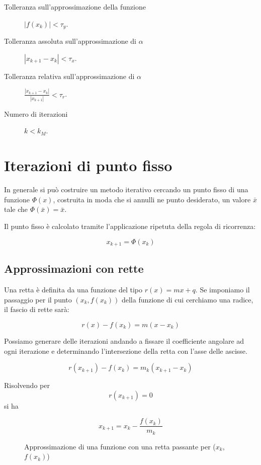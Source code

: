 \documentclass[12pt]{article}
\theoremstyle{plain}%
\theoremstyle{definition}
\theoremstyle{remark}
\begin{document}
\begin{description}
\item[Tolleranza sull'approssimazione della funzione]$|f(x_k)| < \tau_y$.
\item[Tolleranza assoluta sull'approssimazione di $\alpha$] $|x_{k + 1} - x_{k}| < \tau_x$.
\item[Tolleranza relativa sull'approssimazione di $\alpha$] $\frac{|x_{k + 1} - x_{k}|}{|x_{k+1}|} < \tau_r$.
\item[Numero di iterazioni] $k < k_M$. 
\end{description}




\section{Iterazioni di punto fisso}

In generale si può costruire un metodo iterativo cercando un punto fisso di una funzione $\Phi(x)$,
costruita in moda che si annulli ne punto desiderato, un valore $\bar{x}$ tale che $\Phi(\bar{x}) = \bar{x}$.

Il punto fisso è calcolato tramite l'applicazione ripetuta della regola di ricorrenza:

$$x_{k+1} = \Phi(x_k)$$

\subsection{Approssimazioni con rette}

Una retta è definita da una funzione del tipo $r(x) = m x + q$.
Se imponiamo il passaggio per il punto $(x_k, f(x_k))$ della funzione di cui cerchiamo una radice, il fascio di rette sarà:

$$r(x) - f(x_k) = m (x - x_k)$$

Possiamo generare delle iterazioni andando a fissare il coefficiente angolare ad ogni iterazione e determinando l'intersezione della retta con l'asse delle ascisse.

$$r(x_{k+1}) - f(x_k) = m_k (x_{k+1} - x_k)$$

Risolvendo per $$r(x_{k+1}) = 0$$ si ha

\begin{equation}
    x_{k+1} = x_k - \frac{f(x_k)}{m_k}
\end{equation}

\begin{figure}[!htbp]
    \begin{center}
        
        \caption{Approssimazione di una funzione con una retta passante per ($x_k$, $f(x_k)$)}
        \label{fig:retta_approx}
    \end{center}
\end{figure}

% 

% 



% 
\end{document}
